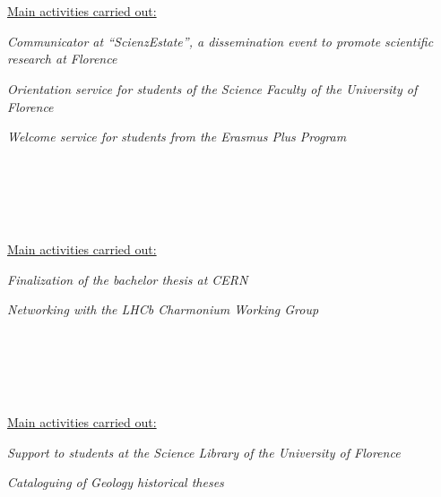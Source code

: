 \begin{cvcontent}
  \\ [1.5mm]
  \\ [1.5mm]
  {\normalsize \color{maincolor} \ul{Main activities carried out:}\\ [1.5mm]
  \begin{itemize*}[label=\textcolor{iconcolor}{\textbullet}]
    \item \emph{Communicator at ``ScienzEstate'', a dissemination 
      event to promote scientific research at Florence}\\ [0.5mm]
    \item \emph{Orientation service for students of the Science 
      Faculty of the University of Florence}\\ [0.5mm]
    \item \emph{Welcome service for students from the Erasmus 
      Plus Program}
  \end{itemize*}}
  \\ [5mm]
  \\ [0.5mm]
  \\ [1.5mm]
  \\ [1.5mm]
  {\normalsize \color{maincolor} \ul{Main activities carried out:}\\ [1.5mm]
  \begin{itemize*}[label=\textcolor{iconcolor}{\textbullet}]
    \item \emph{Finalization of the bachelor thesis at CERN}\\ [0.5mm]
    \item \emph{Networking with the LHCb Charmonium Working Group}
  \end{itemize*}}
  \\ [5mm]
  \\ [0.5mm]
  \\ [1.5mm]
  \\ [1.5mm]
  {\normalsize \color{maincolor} \ul{Main activities carried out:}\\ [1.5mm]
  \begin{itemize*}[label=\textcolor{iconcolor}{\textbullet}]
    \item \emph{Support to students at the Science Library 
                of the University of Florence}\\ [0.5mm]
    \item \emph{Cataloguing of Geology historical theses}
  \end{itemize*}}
\end{cvcontent}